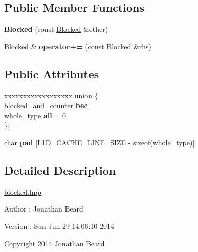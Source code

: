 \subsection*{Public Member Functions}
\begin{DoxyCompactItemize}
\item 
\hypertarget{struct_blocked_aab6ec9e4b1fd78fa02c50db7d3c1d623}{}\label{struct_blocked_aab6ec9e4b1fd78fa02c50db7d3c1d623} 
{\bfseries Blocked} (const \hyperlink{struct_blocked}{Blocked} \&other)
\item 
\hypertarget{struct_blocked_afe38f1192d5feef760dc1992fdd0bef4}{}\label{struct_blocked_afe38f1192d5feef760dc1992fdd0bef4} 
\hyperlink{struct_blocked}{Blocked} \& {\bfseries operator+=} (const \hyperlink{struct_blocked}{Blocked} \&rhs)
\end{DoxyCompactItemize}
\subsection*{Public Attributes}
\begin{DoxyCompactItemize}
\item 
\hypertarget{struct_blocked_a8a4071ed2ac86920e4fcd21bc39cae48}{}\label{struct_blocked_a8a4071ed2ac86920e4fcd21bc39cae48} 
\begin{tabbing}
xx\=xx\=xx\=xx\=xx\=xx\=xx\=xx\=xx\=\kill
union \{\\
\>\hyperlink{struct_blocked_1_1blocked__and__counter}{blocked\_and\_counter} {\bfseries bec}\\
\>whole\_type {\bfseries all} = 0\\
\}; \\

\end{tabbing}\item 
\hypertarget{struct_blocked_a655f1539c05155f99a1b016331a89b90}{}\label{struct_blocked_a655f1539c05155f99a1b016331a89b90} 
char {\bfseries pad} \mbox{[}L1\+D\+\_\+\+C\+A\+C\+H\+E\+\_\+\+L\+I\+N\+E\+\_\+\+S\+I\+ZE -\/ sizeof(whole\+\_\+type)\mbox{]}
\end{DoxyCompactItemize}


\subsection{Detailed Description}
\hyperlink{blocked_8hpp_source}{blocked.\+hpp} -\/ \begin{DoxyAuthor}{Author}
\+: Jonathan Beard 
\end{DoxyAuthor}
\begin{DoxyVersion}{Version}
\+: Sun Jun 29 14\+:06\+:10 2014
\end{DoxyVersion}
Copyright 2014 Jonathan Beard

